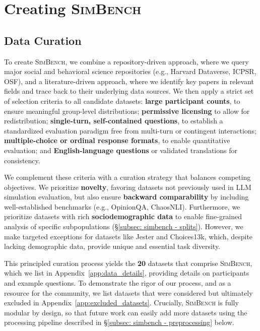 \documentclass{article} %
\begin{document}
\section{Creating \textsc{SimBench}}
\label{sec: simbench}


\subsection{Data Curation}
\label{subsec: simbench - selection process}
To create \textsc{SimBench}, we combine a repository-driven approach, where we query major social and behavioral science repositories (e.g., Harvard Dataverse, ICPSR, OSF), and a literature-driven approach, where we identify key papers in relevant fields and trace back to their underlying data sources. We then apply a strict set of selection criteria to all candidate datasets: \textbf{large participant counts}, to ensure meaningful group-level distributions; \textbf{permissive licensing} to allow for redistribution; \textbf{single-turn, self-contained questions}, to establish a standardized evaluation paradigm free from multi-turn or contingent interactions; \textbf{multiple-choice or ordinal response formats}, to enable quantitative evaluation; and \textbf{English-language questions} or validated translations for consistency.


We complement these criteria with a curation strategy that balances competing objectives. We prioritize \textbf{novelty}, favoring datasets not previously used in LLM simulation evaluation, but also ensure \textbf{backward comparability} by including well-established benchmarks (e.g., OpinionQA, ChaosNLI). Furthermore, we prioritize datasets with rich \textbf{sociodemographic data} to enable fine-grained analysis of specific subpopulations (\S\ref{subsec: simbench - splits}). However, we make targeted exceptions for datasets like Jester and Choices13k, which, despite lacking demographic data, provide unique and essential task diversity.






This principled curation process yields the \textbf{20} datasets that comprise \textsc{SimBench}, which we list in Appendix~\ref{app:data_details}, providing details on participants and example questions. To demonstrate the rigor of our process, and as a resource for the community, we list datasets that were considered but ultimately excluded in Appendix~\ref{app:excluded_datasets}. Crucially, \textsc{SimBench} is fully modular by design, so that future work can easily add more datasets using the processing pipeline described in \S\ref{subsec: simbench - preprocessing} below.
\end{document}

